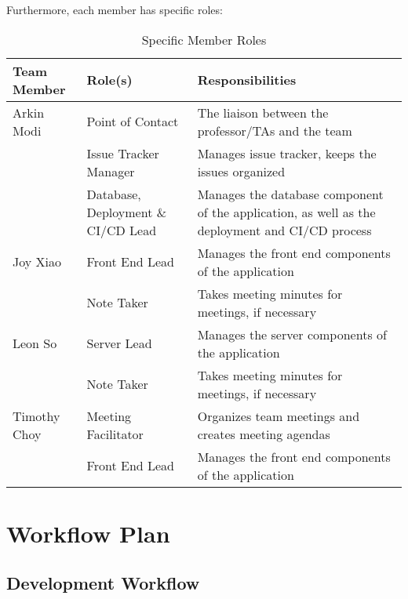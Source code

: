 \documentclass{article}
\begin{document}
Furthermore, each member has specific roles:

\begin{table}
	\centering
	\caption{Specific Member Roles}
	\vspace{5pt}
	\begin{tabular}{|p{}|p{}|p{}|}
		\hline
		\textbf{Team Member} & \textbf{Role(s)} & \textbf{Responsibilities} \\ 
		\hline
		Arkin Modi & Point of Contact & The liaison between the professor/TAs 
		and the team \\
		\cline{2-3}
		& Issue Tracker Manager & Manages issue tracker, keeps the issues 
		organized\\
		\cline{2-3}
		& Database, Deployment \& CI/CD Lead & Manages the database component of the application, as 
		well as the deployment and CI/CD process \\
		\hline
		Joy Xiao & Front End Lead & Manages the front end components of the application \\
		\cline{2-3}
		& Note Taker & Takes meeting minutes for meetings, if necessary \\
		\hline
		Leon So & Server Lead & Manages the server components of the application \\
		\cline{2-3}
		& Note Taker & Takes meeting minutes for meetings, if necessary \\
		\hline
		Timothy Choy & Meeting Facilitator & Organizes team meetings and creates meeting agendas \\
		\cline{2-3}
		& Front End Lead & Manages the front end components of the application \\
		\hline
	\end{tabular}
\end{table}

\section{Workflow Plan}


\subsection{Development Workflow}
\end{document}

